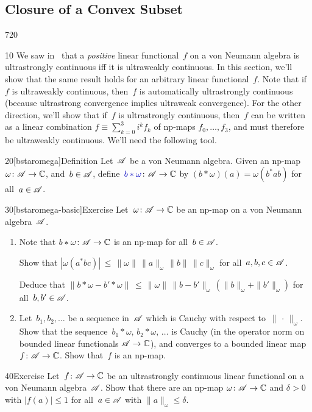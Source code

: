 \subsection{Closure of a Convex Subset}
\begin{parsec}{720}%
\begin{point}{10}%
We saw in~
that a \emph{positive} linear functional~$f$
on a von Neumann algebra 
is ultrastrongly continuous iff it is ultraweakly continuous.
In this section, we'll show that the same result holds
for an arbitrary linear functional~$f$.
Note that if~$f$ is ultraweakly continuous,
then~$f$ is automatically ultrastrongly continuous
(because ultrastrong convergence implies ultraweak convergence).
For the other direction,
we'll show that if~$f$ is ultrastrongly continuous,
then~$f$ can be written as a linear combination
$f\equiv \sum_{k=0}^3 i^k f_k$
of np-maps $f_0,\dotsc,f_3$,
and must therefore be ultraweakly continuous.
We'll need the following tool.
\end{point}
\begin{point}{20}[bstaromega]{Definition}%
Let~$\mathscr{A}$ be a von Neumann algebra.
Given an np-map $\omega\colon \mathscr{A}\to\mathbb{C}$,
and~$b\in \mathscr{A}$,
define~$\Define{b*\omega}\colon \scrA\to \C$%
	by
$(b*\omega)(a)=\omega(b^*ab)$ for all~$a\in \mathscr{A}$.
\end{point}
\begin{point}{30}[bstaromega-basic]{Exercise}%
Let~$\omega\colon \mathscr{A}\to \mathbb{C}$ be an np-map on a von Neumann algebra~$\mathscr{A}$.
\begin{enumerate}
\item
Note that $b*\omega\colon \mathscr{A}\to\mathbb{C}$
is an np-map for all~$b\in \mathscr{A}$.

Show that $\left|\omega(a^*bc)\right| 
\,\leq\, \|\omega\|\,\|a\|_\omega\, \|b\|\, \|c\|_\omega$
for all~$a,b,c\in\mathscr{A}$.

Deduce that $\| b*\omega - b'*\omega\|
\,\leq\, \|\omega\| \,\|b-b'\|_\omega\, (\|b\|_\omega + \|b'\|_\omega)$
for all~$b,b'\in\mathscr{A}$.

\item
Let~$b_1,b_2,\dotsc$ be a sequence in~$\mathscr{A}$
which is Cauchy with respect to~$\|\,\cdot\,\|_\omega$.
Show that the sequence~$b_1*\omega,\,b_2*\omega,\,\dotsc$ 
is Cauchy (in the operator norm
on bounded linear functionals $\mathscr{A}\to\mathbb{C}$),
and converges to a bounded linear map~$f\colon \mathscr{A}\to\mathbb{C}$.
Show that~$f$ is an np-map.
\end{enumerate}
\end{point}
\begin{point}{40}{Exercise}%
Let~$f\colon \mathscr{A}\to \mathbb{C}$ be an ultrastrongly continuous linear
functional on a von Neumann algebra~$\mathscr{A}$.
Show that there are an np-map
$\omega\colon \mathscr{A}\to \mathbb{C}$
and $\delta>0$
with $\left|f(a)\right|\leq 1$
for all~$a\in\mathscr{A}$ with $\|a\|_\omega \leq \delta$.


\end{point}
\end{parsec}
